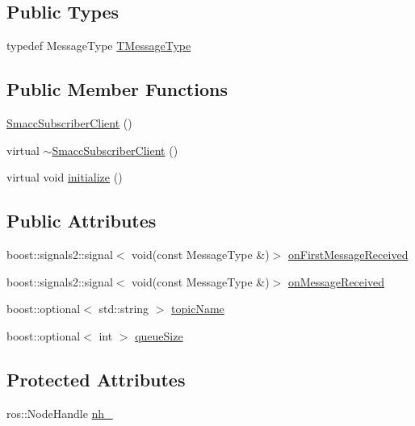 \subsection*{Public Types}
\begin{DoxyCompactItemize}
\item 
typedef Message\+Type \hyperlink{classsmacc_1_1SmaccSubscriberClient_a25c1717b0a7ab42d4dc7c2a12bd3a12b}{T\+Message\+Type}
\end{DoxyCompactItemize}
\subsection*{Public Member Functions}
\begin{DoxyCompactItemize}
\item 
\hyperlink{classsmacc_1_1SmaccSubscriberClient_a39f91857807ebd5c8d8500a8f52080a0}{Smacc\+Subscriber\+Client} ()
\item 
virtual \hyperlink{classsmacc_1_1SmaccSubscriberClient_aa028dd15aaa3b2f147457b4aebc946fe}{$\sim$\+Smacc\+Subscriber\+Client} ()
\item 
virtual void \hyperlink{classsmacc_1_1SmaccSubscriberClient_afc2e5523c38250722e7197dd535599ce}{initialize} ()
\end{DoxyCompactItemize}
\subsection*{Public Attributes}
\begin{DoxyCompactItemize}
\item 
boost\+::signals2\+::signal$<$ void(const Message\+Type \&)$>$ \hyperlink{classsmacc_1_1SmaccSubscriberClient_a9c77384c3271293906b47c1e94d55036}{on\+First\+Message\+Received}
\item 
boost\+::signals2\+::signal$<$ void(const Message\+Type \&)$>$ \hyperlink{classsmacc_1_1SmaccSubscriberClient_afa92da03ebd637e2565eee5cf226ca43}{on\+Message\+Received}
\item 
boost\+::optional$<$ std\+::string $>$ \hyperlink{classsmacc_1_1SmaccSubscriberClient_a573625f4b97228c0e9110fb4538722f2}{topic\+Name}
\item 
boost\+::optional$<$ int $>$ \hyperlink{classsmacc_1_1SmaccSubscriberClient_ac75e9d490c0383a7a686f05b2d4fcc68}{queue\+Size}
\end{DoxyCompactItemize}
\subsection*{Protected Attributes}
\begin{DoxyCompactItemize}
\item 
ros\+::\+Node\+Handle \hyperlink{classsmacc_1_1SmaccSubscriberClient_a687bdd388ad68d5831138e7eb70fb9ae}{nh\+\_\+}
\end{DoxyCompactItemize}
